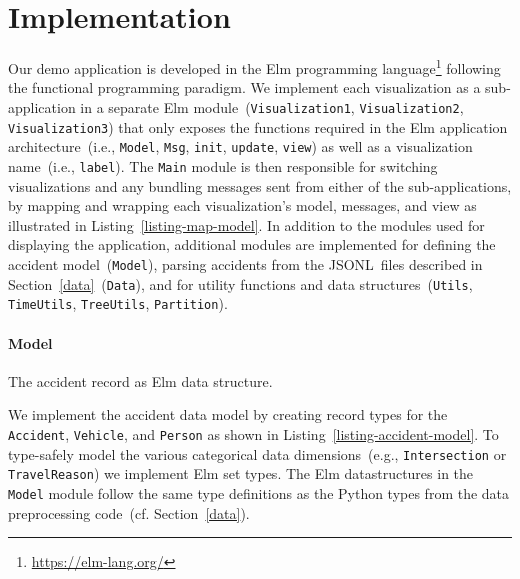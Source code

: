\section{Implementation}
\label{implementation}
\begin{listing}
    
    \caption{Example of wrapping the \lstinline{update} function from \lstinline{Visualization1} inside the \lstinline{Main} module's \lstinline{update} function. Commands sent from \lstinline{Visualization1} are then mapped to the \lstinline{Main} modules types.}
    \label{listing-map-model}
\end{listing}
Our demo application is developed in the Elm programming language\footnote{\url{https://elm-lang.org/}} following the functional programming paradigm. We implement each visualization as a sub-application in a separate Elm module~(\lstinline{Visualization1}, \lstinline{Visualization2}, \lstinline{Visualization3}) that only exposes the functions required in the Elm application architecture~(i.e., \lstinline{Model}, \lstinline{Msg}, \lstinline{init}, \lstinline{update}, \lstinline{view}) as well as a visualization name~(i.e., \lstinline{label}). The \lstinline{Main} module is then responsible for switching visualizations and any bundling messages sent from either of the sub-applications, by mapping and wrapping each visualization's model, messages, and view as illustrated in Listing~\ref{listing-map-model}. In addition to the modules used for displaying the application, additional modules are implemented for defining the accident model~(\lstinline{Model}), parsing accidents from the JSONL~files described in Section~\ref{data}~(\lstinline{Data}), and for utility functions and data structures~(\lstinline{Utils}, \lstinline{TimeUtils}, \lstinline{TreeUtils}, \lstinline{Partition}).

\paragraph{Model}
\begin{listing}
    
    \caption{The accident record as Elm data structure.}
    \label{listing-accident-model}
\end{listing}
We implement the accident data model by creating record types for the \lstinline[breaklines=false]{Accident}, \lstinline{Vehicle}, and \lstinline{Person} as shown in Listing~\ref{listing-accident-model}. To type-safely model the various categorical data dimensions~(e.g., \lstinline{Intersection} or \lstinline{TravelReason}) we implement Elm set types. The Elm datastructures in the \lstinline{Model} module follow the same type definitions as the Python types from the data preprocessing code~(cf. Section~\ref{data}).

